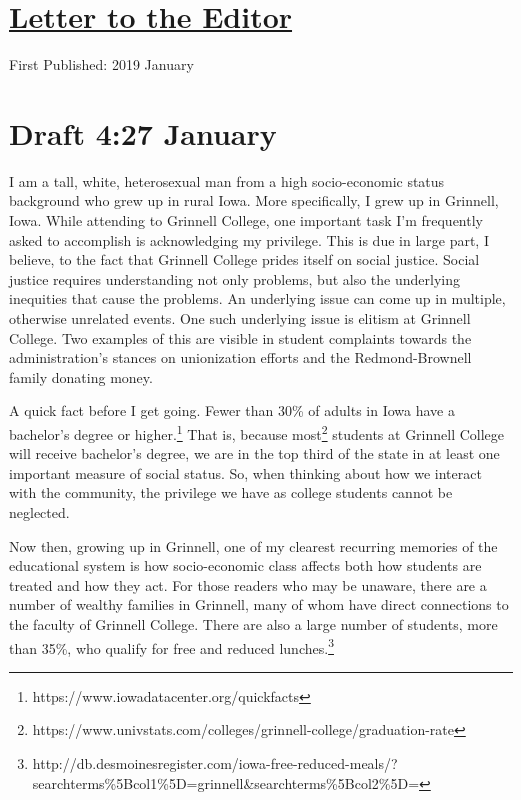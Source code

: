 \documentclass[12pt]{article}[titlepage]
\newcommand{\1}{\={a}}
\newcommand{\2}{\={e}}
\newcommand{\3}{\={\i}}
\newcommand{\4}{\=o}
\newcommand{\5}{\=u}
\newcommand{\6}{\={A}}
\renewcommand{\,}{\textsuperscript{,}}
\begin{document}
\doublespacing
\section{\href{letter-to-the-editor.html}{Letter to the Editor}}
First Published: 2019 January
\section{Draft 4:27 January}
I am a tall, white, heterosexual man from a high socio-economic status background who grew up in rural Iowa.
More specifically, I grew up in Grinnell, Iowa.
While attending to Grinnell College, one important task I'm frequently asked to accomplish is acknowledging my privilege.
This is due in large part, I believe, to the fact that Grinnell College prides itself on social justice.
Social justice requires understanding not only problems, but also the underlying inequities that cause the problems.
An underlying issue can come up in multiple, otherwise unrelated events.
One such underlying issue is elitism at Grinnell College.
Two examples of this are visible in student complaints towards the administration's stances on unionization efforts and the Redmond-Brownell family donating money.

A quick fact before I get going.
Fewer than 30\% of adults in Iowa have a bachelor's degree or higher.\footnote{https://www.iowadatacenter.org/quickfacts}
That is, because most\footnote{https://www.univstats.com/colleges/grinnell-college/graduation-rate} students at Grinnell College will receive bachelor's degree, we are in the top third of the state in at least one important measure of social status.
So, when thinking about how we interact with the community, the privilege we have as college students cannot be neglected.

Now then, growing up in Grinnell, one of my clearest recurring memories of the educational system is how socio-economic class affects both how students are treated and how they act.
For those readers who may be unaware, there are a number of wealthy families in Grinnell, many of whom have direct connections to the faculty of Grinnell College.
There are also a large number of students, more than 35\%, who qualify for free and reduced lunches.\footnote{http://db.desmoinesregister.com/iowa-free-reduced-meals/?searchterms\%5Bcol1\%5D=grinnell&searchterms\%5Bcol2\%5D=}
\end{document}
